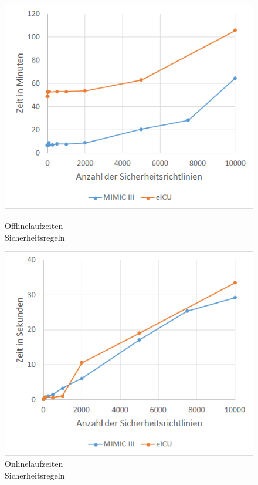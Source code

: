\documentclass[german,version-2020-11]{uzl-thesis}
\begin{document}
	\begin{figure}[ht]
	\begin{minipage}{.5\textwidth}
		\centering
		\includegraphics[width=0.9\linewidth]{assets/OfflineEicuMimic.png}
		\caption{Offlinelaufzeiten \\ Sicherheitsregeln}
		\label{fig:offlinesecures}
	\end{minipage}
	\begin{minipage}{.5\textwidth}
		\centering
		\includegraphics[width=0.9\linewidth]{assets/onlineEicuMimic.png}
		\caption{Onlinelaufzeiten \\ Sicherheitsregeln}
		\label{fig:onlinesecures}
	\end{minipage}
\end{figure}
\end{document}
